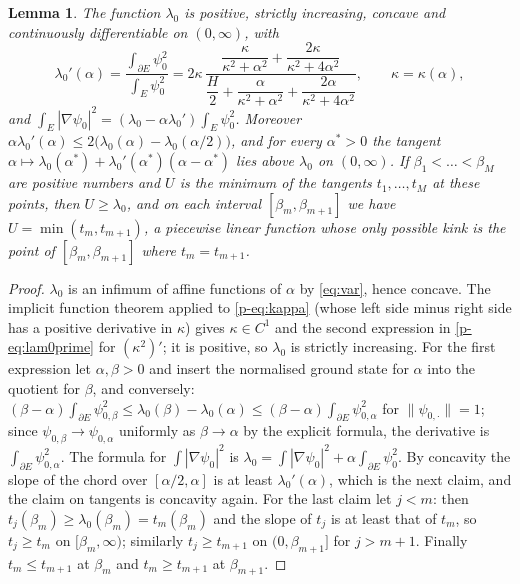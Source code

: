 \documentclass[11pt]{article}
\newtheorem{lemma}[theorem]{Lemma}
\theoremstyle{remark}
\begin{document}
\begin{lemma}\label{p-lem:lam0}
The function $\lambda_0$ is positive, strictly increasing, concave and continuously
differentiable on $(0,\infty)$, with
\begin{equation}\label{p-eq:lam0prime}
  \lambda_0'(\alpha)=\frac{\int_{\partial E}\psi_0^2}{\int_E\psi_0^2}
  =2\kappa\,\frac{\dfrac{\kappa}{\kappa^2+\alpha^2}+\dfrac{2\kappa}{\kappa^2+4\alpha^2}}
  {\dfrac H2+\dfrac{\alpha}{\kappa^2+\alpha^2}+\dfrac{2\alpha}{\kappa^2+4\alpha^2}},
  \qquad \kappa=\kappa(\alpha),
\end{equation}
and $\int_E|\nabla\psi_0|^2=(\lambda_0-\alpha\lambda_0')\int_E\psi_0^2$. Moreover
$\alpha\lambda_0'(\alpha)\le2\bigl(\lambda_0(\alpha)-\lambda_0(\alpha/2)\bigr)$, and for every
$\alpha^*>0$ the tangent $\alpha\mapsto\lambda_0(\alpha^*)+\lambda_0'(\alpha^*)(\alpha-\alpha^*)$
lies above $\lambda_0$ on $(0,\infty)$. If $\beta_1<\dots<\beta_M$ are positive numbers and $U$
is the minimum of the tangents $t_1,\dots,t_M$ at these points, then $U\ge\lambda_0$, and on
each interval $[\beta_m,\beta_{m+1}]$ we have $U=\min(t_m,t_{m+1})$, a piecewise linear function
whose only possible kink is the point of $[\beta_m,\beta_{m+1}]$ where $t_m=t_{m+1}$.
\end{lemma}

\begin{proof}
$\lambda_0$ is an infimum of affine functions of $\alpha$ by \eqref{eq:var}, hence concave. The
implicit function theorem applied to \eqref{p-eq:kappa} (whose left side minus right side has a
positive derivative in $\kappa$) gives $\kappa\in C^1$ and the second expression in
\eqref{p-eq:lam0prime} for $(\kappa^2)'$; it is positive, so $\lambda_0$ is strictly increasing. For the first expression let $\alpha,\beta>0$ and insert
the normalised ground state for $\alpha$ into the quotient for $\beta$, and conversely:
$(\beta-\alpha)\int_{\partial E}\psi_{0,\beta}^2\le\lambda_0(\beta)-\lambda_0(\alpha)\le
(\beta-\alpha)\int_{\partial E}\psi_{0,\alpha}^2$ for $\|\psi_{0,\cdot}\|=1$; since
$\psi_{0,\beta}\to\psi_{0,\alpha}$ uniformly as $\beta\to\alpha$ by the explicit formula, the
derivative is $\int_{\partial E}\psi_{0,\alpha}^2$. The formula for $\int|\nabla\psi_0|^2$ is
$\lambda_0=\int|\nabla\psi_0|^2+\alpha\int_{\partial E}\psi_0^2$. By concavity the slope of the
chord over $[\alpha/2,\alpha]$ is at least $\lambda_0'(\alpha)$, which is the next claim, and the
claim on tangents is concavity again. For the last claim let $j<m$: then
$t_j(\beta_m)\ge\lambda_0(\beta_m)=t_m(\beta_m)$ and the slope of $t_j$ is at least that of
$t_m$, so $t_j\ge t_m$ on $[\beta_m,\infty)$; similarly $t_j\ge t_{m+1}$ on $(0,\beta_{m+1}]$
for $j>m+1$. Finally $t_m\le t_{m+1}$ at $\beta_m$ and $t_m\ge t_{m+1}$ at $\beta_{m+1}$.
\end{proof}
\end{document}

